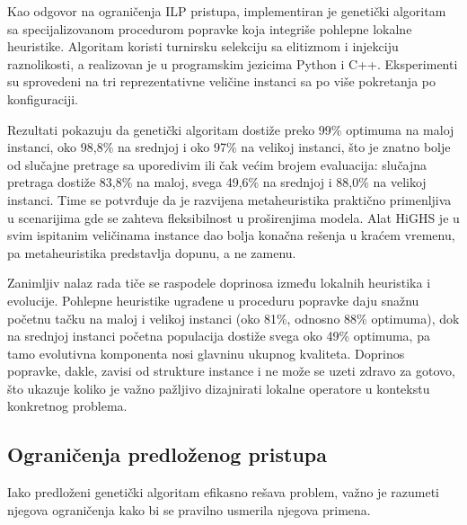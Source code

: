 \documentclass[12pt]{article}
\begin{document}
Kao odgovor na ograničenja ILP pristupa, implementiran je genetički algoritam sa specijalizovanom procedurom popravke koja integriše pohlepne lokalne heuristike. Algoritam koristi turnirsku selekciju sa elitizmom i injekciju raznolikosti, a realizovan je u programskim jezicima Python i C++. Eksperimenti su sprovedeni na tri reprezentativne veličine instanci sa po više pokretanja po konfiguraciji.

Rezultati pokazuju da genetički algoritam dostiže preko 99\% optimuma na maloj instanci, oko 98,8\% na srednjoj i oko 97\% na velikoj instanci, što je znatno bolje od slučajne pretrage sa uporedivim ili čak većim brojem evaluacija: slučajna pretraga dostiže 83,8\% na maloj, svega 49,6\% na srednjoj i 88,0\% na velikoj instanci. Time se potvrđuje da je razvijena metaheuristika praktično primenljiva u scenarijima gde se zahteva fleksibilnost u proširenjima modela. Alat HiGHS je u svim ispitanim veličinama instance dao bolja konačna rešenja u kraćem vremenu, pa metaheuristika predstavlja dopunu, a ne zamenu.

Zanimljiv nalaz rada tiče se raspodele doprinosa između lokalnih heuristika i evolucije. Pohlepne heuristike ugrađene u proceduru popravke daju snažnu početnu tačku na maloj i velikoj instanci (oko 81\%, odnosno 88\% optimuma), dok na srednjoj instanci početna populacija dostiže svega oko 49\% optimuma, pa tamo evolutivna komponenta nosi glavninu ukupnog kvaliteta. Doprinos popravke, dakle, zavisi od strukture instance i ne može se uzeti zdravo za gotovo, što ukazuje koliko je važno pažljivo dizajnirati lokalne operatore u kontekstu konkretnog problema.

\subsection{Ograničenja predloženog pristupa}

Iako predloženi genetički algoritam efikasno rešava problem, važno je razumeti njegova ograničenja kako bi se pravilno usmerila njegova primena.
\end{document}
